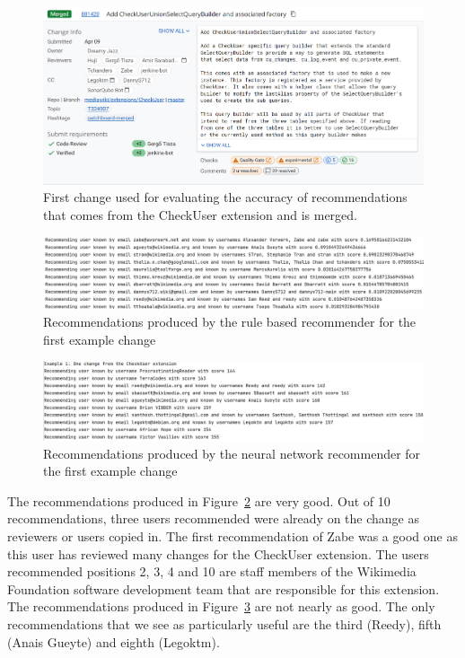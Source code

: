 \begin{figure}[H]
    \centering
    \includegraphics[scale=0.6]{images/checkuser-example-change-1-on-gerrit.png}
    \caption{First change used for evaluating the accuracy of recommendations that comes from the CheckUser extension and is merged.}
    \label{fig:checkuser-example-change-1}
\end{figure}

\begin{figure}[H]
    \centering
    \includegraphics[scale=0.5]{images/rule-based-example-1.png}
    \caption{Recommendations produced by the rule based recommender for the first example change}
    \label{fig:rule-based-recommender-result-for-example-change-1}
\end{figure}

\begin{figure}[H]
    \centering
    \includegraphics[scale=0.5]{images/neural-network-example-1.png}
    \caption{Recommendations produced by the neural network recommender for the first example change}
    \label{fig:neural-network-recommender-result-for-example-change-1}
\end{figure}

The recommendations produced in Figure~\ref{fig:rule-based-recommender-result-for-example-change-1} are very good. Out of 10 recommendations, three users recommended were already on the change as reviewers or users copied in. The first recommendation of Zabe was a good one as this user has reviewed many changes for the CheckUser extension. The users recommended positions 2, 3, 4 and 10 are staff members of the Wikimedia Foundation software development team that are responsible for this extension. The recommendations produced in Figure~\ref{fig:neural-network-recommender-result-for-example-change-1} are not nearly as good. The only recommendations that we see as particularly useful are the third (Reedy), fifth (Anais Gueyte) and eighth (Legoktm).

